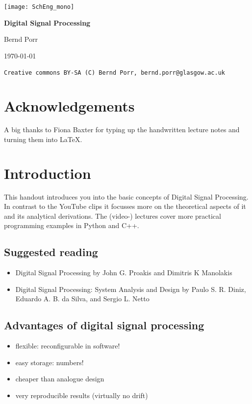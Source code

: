 \documentclass[12pt,a4paper]{article}
\begin{document}
\begin{center}
\mbox{\texttt{[image: SchEng\_mono]}}

\vfill

{\bf \Huge Digital Signal Processing}

\bigskip

{\Large Bernd Porr}

\vfill

{\tiny \today}

\bigskip

\noindent\texttt{Creative commons BY-SA (C) Bernd Porr, bernd.porr@glasgow.ac.uk}




\end{center}

\clearpage

\tableofcontents

\clearpage

\section{Acknowledgements}
A big thanks to Fiona Baxter for typing up the handwritten lecture notes and turning
them into \LaTeX.

\section{Introduction}
This handout introduces you into the basic concepts of Digital Signal Processing.
In contrast to the YouTube clips it focusses more on the theoretical
aspects of it and its analytical derivations. The (video-) lectures
cover more practical programming examples in Python and C++.

\subsection{Suggested reading}
\begin{itemize}
\item Digital Signal Processing
by John G. Proakis and Dimitris K Manolakis
\item Digital Signal Processing: System Analysis and Design by Paulo S. R. Diniz, Eduardo A. B. da Silva, and Sergio L. Netto 
\end{itemize}

\subsection{Advantages of digital signal processing}
\begin{itemize}
\item flexible: reconfigurable in software!
\item easy storage: numbers!
\item cheaper than analogue design
\item very reproducible results (virtually no drift)
\end{itemize}
\end{document}
